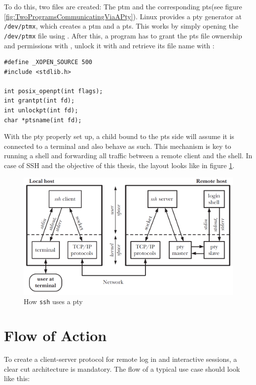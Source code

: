 \documentclass[10pt,a4paper,titlepage,twoside,english,final]{zhawreprt}
\begin{document}
To do this, two files are created: The \gls{ptm} and the corresponding \gls{pts}(see figure \ref{fig:TwoProgramsCommunicatingViaAPty}). \gls{Linux} provides a \gls{pty} generator at \texttt{/dev/ptmx}, which creates a \gls{ptm} and a \gls{pts}. This works by simply opening the \texttt{/dev/ptmx} file using \cite{posix_openpt}. After this, a program has to grant the \gls{pts} file ownership and permissions with \cite{grantpt}, unlock it with \cite{unlockpt} and retrieve its file name with \cite{ptsname}:
\setlistingC
\begin{lstlisting}[caption={\gls{pty} related \gls{Linux} \gls{API} functions},label=lst:PtyFunctions]
#define _XOPEN_SOURCE 500
#include <stdlib.h>

int posix_openpt(int flags);
int grantpt(int fd);
int unlockpt(int fd);
char *ptsname(int fd);
\end{lstlisting}

With the \gls{pty} properly set up, a child bound to the \gls{pts} side will assume it is connected to a \gls{terminal} and also behave as such. This mechanism is key to running a \gls{shell} and forwarding all traffic between a remote client and the \gls{shell}. In case of \gls{SSH} and the objective of this thesis, the layout looks like in figure \ref{fig:HowSSHUsesPty}.
\begin{figure}[ht]
\includegraphics[width=\textwidth]{PseudoterminalSSH}
\caption{How \texttt{ssh} uses a \gls{pty}\citep[p.1378]{KerriskTLPI}}
\label{fig:HowSSHUsesPty}
\end{figure}

\newpage
\section{Flow of Action}\label{sec:DesignFlowOfAction}
To create a client-server protocol for remote log in and interactive sessions, a clear cut architecture is mandatory. The flow of a typical use case should look like this:
\end{document}
